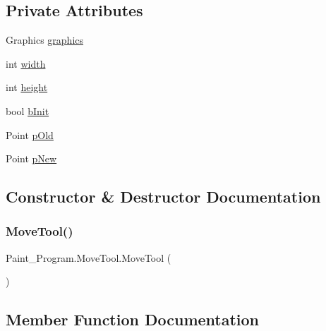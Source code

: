 \subsection*{Private Attributes}
\begin{DoxyCompactItemize}
\item 
Graphics \mbox{\hyperlink{class_paint___program_1_1_move_tool_add8dae61206480450c2933ba49eed5f3}{graphics}}
\item 
int \mbox{\hyperlink{class_paint___program_1_1_move_tool_ac052d025ab503efc581c5ce75caa140b}{width}}
\item 
int \mbox{\hyperlink{class_paint___program_1_1_move_tool_aa3f72d1e3720c8044becf88d53760856}{height}}
\item 
bool \mbox{\hyperlink{class_paint___program_1_1_move_tool_a380491e5f65765dca01c2220b94ad8d4}{b\+Init}}
\item 
Point \mbox{\hyperlink{class_paint___program_1_1_move_tool_ad5eab9570c8179da16a6eaeb00fb904d}{p\+Old}}
\item 
Point \mbox{\hyperlink{class_paint___program_1_1_move_tool_afb776cfa6838c75c294a66f99beaddfe}{p\+New}}
\end{DoxyCompactItemize}


\subsection{Constructor \& Destructor Documentation}
\mbox{\label{class_paint___program_1_1_move_tool_a42aa998e030cffd3afd1de53927327d6}} 
\subsubsection{\texorpdfstring{Move\+Tool()}{MoveTool()}}
{\footnotesize\ttfamily Paint\+\_\+\+Program.\+Move\+Tool.\+Move\+Tool (\begin{DoxyParamCaption}{ }\end{DoxyParamCaption})\hspace{0.3cm}{\ttfamily [inline]}}



\subsection{Member Function Documentation}
\mbox{\label{class_paint___program_1_1_move_tool_a6341409c4de402ff447db2c542cc6b5b}} 

